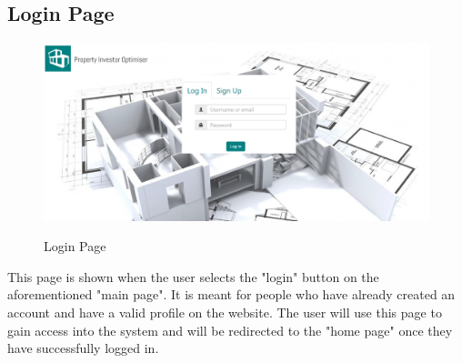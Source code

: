 \documentclass[a4paper,12pt]{article}
\begin{document}
\subsection{Login Page}
	\begin{figure}[H]
		\includegraphics[width=0.9\linewidth, center]{./System/Login.PNG}\\[0.4cm]  
		\caption{Login Page}
	\end{figure}
This page is shown when the user selects the "login" button on the aforementioned "main page". It is meant for people who have already created an account and have a valid profile on the website. The user will use this page to gain access into the system and will be redirected to the "home page" once they have successfully logged in.

\end{document}
